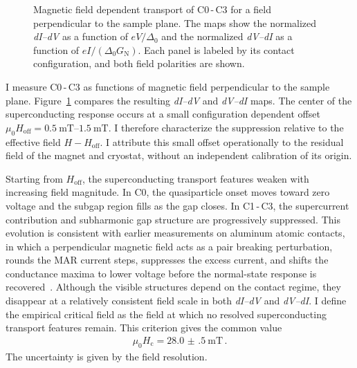         \begin{figure}[t]
            \centering
            \hfill
            \caption{
                Magnetic field dependent transport of C0\,-\,C3 for a field perpendicular to the sample plane. The maps show the normalized \textit{dI--dV} as a function of $eV/\Delta_0$ and the normalized \textit{dV--dI} as a function of $eI/(\Delta_0G_\mathrm{N})$. Each panel is labeled by its contact configuration, and both field polarities are shown.
                }
            \label{fig:ac:magnetic-fields}
        \end{figure}

        I measure C0\,-\,C3 as functions of magnetic field perpendicular to the sample plane. Figure~\ref{fig:ac:magnetic-fields} compares the resulting \textit{dI--dV} and \textit{dV--dI} maps. The center of the superconducting response occurs at a small configuration dependent offset $\mu_0H_\mathrm{off}=\qtyrange{0.5}{1.5}{\milli\tesla}$. I therefore characterize the suppression relative to the effective field $H-H_\mathrm{off}$. I attribute this small offset operationally to the residual field of the magnet and cryostat, without an independent calibration of its origin.

        Starting from $H_\mathrm{off}$, the superconducting transport features weaken with increasing field magnitude. In C0, the quasiparticle onset moves toward zero voltage and the subgap region fills as the gap closes. In C1\,-\,C3, the supercurrent contribution and subharmonic gap structure are progressively suppressed. This evolution is consistent with earlier measurements on aluminum atomic contacts, in which a perpendicular magnetic field acts as a pair breaking perturbation, rounds the MAR current steps, suppresses the excess current, and shifts the conductance maxima to lower voltage before the normal-state response is recovered~\cite{scheer_conduction-channels_2000}. Although the visible structures depend on the contact regime, they disappear at a relatively consistent field scale in both \textit{dI--dV} and \textit{dV--dI}. I define the empirical critical field as the field at which no resolved superconducting transport features remain. This criterion gives the common value
        \begin{align}
            \mu_0H_\mathrm{c} = \qty{28.0(5)}{\milli\tesla}\,.
            \label{eq:ac:magnetic-field:critical-field}
        \end{align}
        The uncertainty is given by the field resolution.

